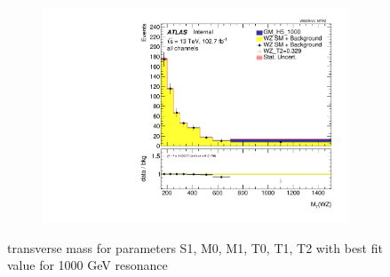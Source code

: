 \documentclass[../Bachelorarbeit.tex]{subfiles}
\begin{document}
\begin{figure}[h]
\begin{subfigure}{0.45\textwidth}
    \end{subfigure}
    \begin{subfigure}{0.45\textwidth}
        \includegraphics[width=\textwidth]{Plots/ALL_MTWZ_right_color/GM_H5_1000/T2/2022-05-07/VBSSR/all_VV_MTWZ.pdf}
    \end{subfigure}

    \caption{transverse mass for parameters S1, M0, M1, T0, T1, T2 with best fit value for 1000 GeV resonance}
    \label{fig:all_mtwz_1000}
\end{figure}
\end{document}
